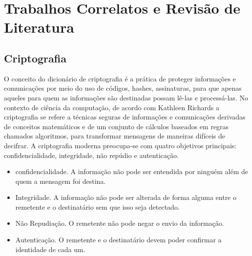 \newcommand{\texCommand}[1]{\texttt{\textbackslash{#1}}}%

\newcommand{\exemplo}[1]{%
\vspace{\baselineskip}%
\noindent\fbox{\begin{minipage}{\textwidth}#1\end{minipage}}%
\\\vspace{\baselineskip}}%

\newcommand{\exemploVerbatim}[1]{%
\vspace{\baselineskip}%
\noindent\fbox{\begin{minipage}{\textwidth}%
#1\end{minipage}}%
\\\vspace{\baselineskip}}%



\section{Trabalhos Correlatos e Revisão de Literatura}

\subsection{Criptografia} %

O conceito do dicionário de criptografia é a prática de proteger informações e comunicações por meio do uso de códigos, hashes, assinaturas, para que apenas aqueles para quem as informações são destinadas possam lê-las e processá-las.
No contexto de ciência da computação, de acordo com Kathleen Richards \cite{what_is_cryptography} a criptografia se refere a técnicas seguras de informações e comunicações derivadas de conceitos matemáticos e de um conjunto de cálculos baseados em regras chamados algoritmos, para transformar mensagens de maneiras difíceis de decifrar.
A criptografia moderna preocupa-se com quatro objetivos principais: confidencialidade, integridade, não repúdio e autenticação.
\begin{itemize}
  \item confidencialidade. A informação não pode ser entendida por ninguém além de quem a mensagem foi destina.
  \item Integridade. A informação não pode ser alterada de forma alguma entre o remetente e o destinatário sem que isso seja detectado.
  \item Não Repudiação. O remetente não pode negar o envio da informação.
  \item Autenticação. O remetente e o destinatário devem poder confirmar a identidade de cada um.
\end{itemize}

